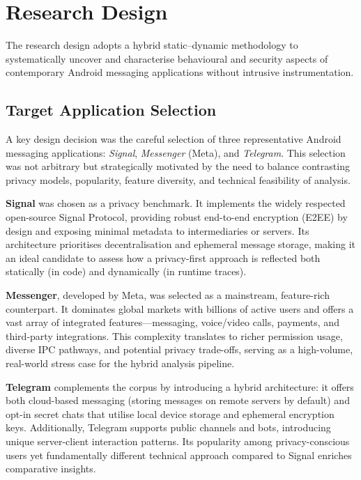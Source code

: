 \documentclass[a4paper,12pt]{report}
\begin{document}
\section{Research Design}

The research design adopts a hybrid static–dynamic methodology to systematically uncover and characterise behavioural and security aspects of contemporary Android messaging applications without intrusive instrumentation.

\subsection{Target Application Selection}

A key design decision was the careful selection of three representative Android messaging applications: \textit{Signal}, \textit{Messenger} (Meta), and \textit{Telegram}. This selection was not arbitrary but strategically motivated by the need to balance contrasting privacy models, popularity, feature diversity, and technical feasibility of analysis.

\textbf{Signal} was chosen as a privacy benchmark. It implements the widely respected open-source Signal Protocol, providing robust end-to-end encryption (E2EE) by design and exposing minimal metadata to intermediaries or servers. Its architecture prioritises decentralisation and ephemeral message storage, making it an ideal candidate to assess how a privacy-first approach is reflected both statically (in code) and dynamically (in runtime traces).

\textbf{Messenger}, developed by Meta, was selected as a mainstream, feature-rich counterpart. It dominates global markets with billions of active users and offers a vast array of integrated features—messaging, voice/video calls, payments, and third-party integrations. This complexity translates to richer permission usage, diverse IPC pathways, and potential privacy trade-offs, serving as a high-volume, real-world stress case for the hybrid analysis pipeline.

\textbf{Telegram} complements the corpus by introducing a hybrid architecture: it offers both cloud-based messaging (storing messages on remote servers by default) and opt-in secret chats that utilise local device storage and ephemeral encryption keys. Additionally, Telegram supports public channels and bots, introducing unique server-client interaction patterns. Its popularity among privacy-conscious users yet fundamentally different technical approach compared to Signal enriches comparative insights.
\end{document}
